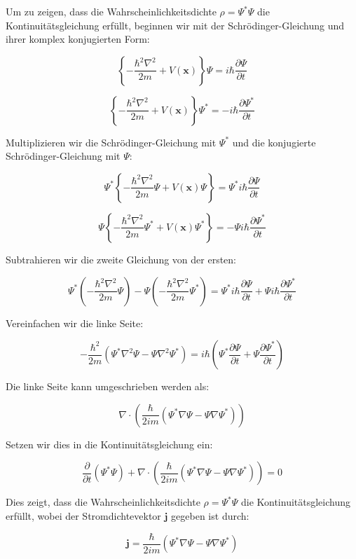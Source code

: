 Um zu zeigen, dass die Wahrscheinlichkeitsdichte \(\rho = \Psi^* \Psi\) die Kontinuitätsgleichung erfüllt, beginnen wir mit der Schrödinger-Gleichung und ihrer komplex konjugierten Form:

\[
\left\{-\frac{\hbar^2 \nabla^2}{2 m} + V(\mathbf{x})\right\} \Psi = i \hbar \frac{\partial \Psi}{\partial t}
\]

\[
\left\{-\frac{\hbar^2 \nabla^2}{2 m} + V(\mathbf{x})\right\} \Psi^* = -i \hbar \frac{\partial \Psi^*}{\partial t}
\]

Multiplizieren wir die Schrödinger-Gleichung mit \(\Psi^*\) und die konjugierte Schrödinger-Gleichung mit \(\Psi\):

\[
\Psi^* \left\{-\frac{\hbar^2 \nabla^2}{2 m} \Psi + V(\mathbf{x}) \Psi\right\} = \Psi^* i \hbar \frac{\partial \Psi}{\partial t}
\]

\[
\Psi \left\{-\frac{\hbar^2 \nabla^2}{2 m} \Psi^* + V(\mathbf{x}) \Psi^*\right\} = -\Psi i \hbar \frac{\partial \Psi^*}{\partial t}
\]

Subtrahieren wir die zweite Gleichung von der ersten:

\[
\Psi^* \left(-\frac{\hbar^2 \nabla^2}{2 m} \Psi\right) - \Psi \left(-\frac{\hbar^2 \nabla^2}{2 m} \Psi^*\right) = \Psi^* i \hbar \frac{\partial \Psi}{\partial t} + \Psi i \hbar \frac{\partial \Psi^*}{\partial t}
\]

Vereinfachen wir die linke Seite:

\[
-\frac{\hbar^2}{2 m} \left(\Psi^* \nabla^2 \Psi - \Psi \nabla^2 \Psi^*\right) = i \hbar \left(\Psi^* \frac{\partial \Psi}{\partial t} + \Psi \frac{\partial \Psi^*}{\partial t}\right)
\]

Die linke Seite kann umgeschrieben werden als:

\[
\nabla \cdot \left(\frac{\hbar}{2 i m} \left(\Psi^* \nabla \Psi - \Psi \nabla \Psi^*\right)\right)
\]

Setzen wir dies in die Kontinuitätsgleichung ein:

\[
\frac{\partial}{\partial t} (\Psi^* \Psi) + \nabla \cdot \left(\frac{\hbar}{2 i m} \left(\Psi^* \nabla \Psi - \Psi \nabla \Psi^*\right)\right) = 0
\]

Dies zeigt, dass die Wahrscheinlichkeitsdichte \(\rho = \Psi^* \Psi\) die Kontinuitätsgleichung erfüllt, wobei der Stromdichtevektor \(\mathbf{j}\) gegeben ist durch:

\[
\mathbf{j} = \frac{\hbar}{2 i m} \left(\Psi^* \nabla \Psi - \Psi \nabla \Psi^*\right)
\]